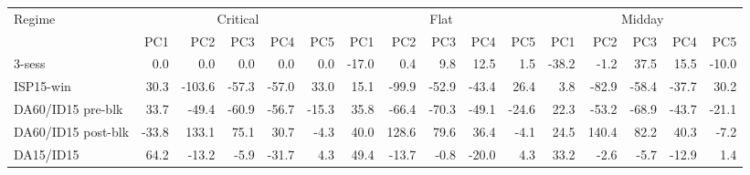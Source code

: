 \begin{tabular}{l r r r r r r r r r r r r r r r}
\toprule
Regime & \multicolumn{5}{c}{Critical} & \multicolumn{5}{c}{Flat} & \multicolumn{5}{c}{Midday} \\
\cmidrule(lr){2-6}\cmidrule(lr){7-11}\cmidrule(lr){12-16}
 & PC1 & PC2 & PC3 & PC4 & PC5 & PC1 & PC2 & PC3 & PC4 & PC5 & PC1 & PC2 & PC3 & PC4 & PC5 \\
\midrule
3-sess & 0.0 & 0.0 & 0.0 & 0.0 & 0.0 & -17.0 & 0.4 & 9.8 & 12.5 & 1.5 & -38.2 & -1.2 & 37.5 & 15.5 & -10.0 \\
ISP15-win & 30.3 & -103.6 & -57.3 & -57.0 & 33.0 & 15.1 & -99.9 & -52.9 & -43.4 & 26.4 & 3.8 & -82.9 & -58.4 & -37.7 & 30.2 \\
DA60/ID15 pre-blk & 33.7 & -49.4 & -60.9 & -56.7 & -15.3 & 35.8 & -66.4 & -70.3 & -49.1 & -24.6 & 22.3 & -53.2 & -68.9 & -43.7 & -21.1 \\
DA60/ID15 post-blk & -33.8 & 133.1 & 75.1 & 30.7 & -4.3 & 40.0 & 128.6 & 79.6 & 36.4 & -4.1 & 24.5 & 140.4 & 82.2 & 40.3 & -7.2 \\
DA15/ID15 & 64.2 & -13.2 & -5.9 & -31.7 & 4.3 & 49.4 & -13.7 & -0.8 & -20.0 & 4.3 & 33.2 & -2.6 & -5.7 & -12.9 & 1.4 \\
\bottomrule
\end{tabular}